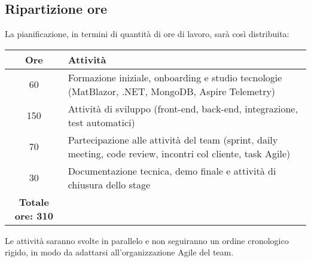 \newpage

\subsection*{Ripartizione ore}

La pianificazione, in termini di quantità di ore di lavoro, sarà così distribuita:

\begin{center}
\begin{tabular}{|c|p{10cm}|}
    \hline
    \textbf{Ore} & \textbf{Attività} \\
    \hline
    60 & Formazione iniziale, onboarding e studio tecnologie (MatBlazor, .NET, MongoDB, Aspire Telemetry) \\
    \hline
    150 & Attività di sviluppo (front-end, back-end, integrazione, test automatici) \\
    \hline
    70 & Partecipazione alle attività del team (sprint, daily meeting, code review, incontri col cliente, task Agile) \\
    \hline
    30 & Documentazione tecnica, demo finale e attività di chiusura dello stage \\
    \hline
    \textbf{Totale ore: 310} & \\
    \hline
\end{tabular}
\end{center}

Le attività saranno svolte in parallelo e non seguiranno un ordine cronologico rigido, in modo da adattarsi all’organizzazione Agile del team.

\newpage





%     

